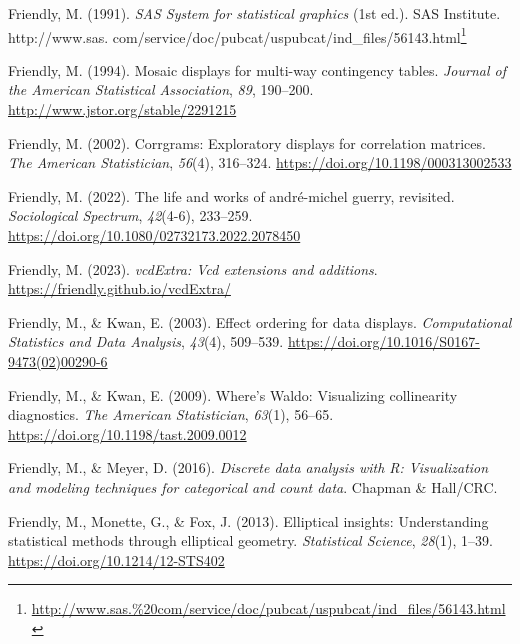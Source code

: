 \documentclass[
  letterpaper,
  10pt,
  krantz2]{krantz}
\newlength{\cslhangindent}
\newlength{\cslentryspacingunit} %
\newenvironment{CSLReferences}[2] %
 {%
  \setlength{\parindent}{0pt}
  \ifodd #1
  \let\oldpar\par
  \def\par{\hangindent=\cslhangindent\oldpar}
  \fi
  \setlength{\parskip}{#2\cslentryspacingunit}
 }%
 {}
\providecommand{\href}[2]{#2\footnote{\url{#1}}}
\begin{document}
\begin{CSLReferences}{1}{0}
\leavevmode{}%
Friendly, M. (1991). \emph{{SAS System} for statistical graphics} (1st
ed.). SAS Institute.
\href{http://www.sas.\%20com/service/doc/pubcat/uspubcat/ind_files/56143.html}{http://www.sas.
com/service/doc/pubcat/uspubcat/ind\_files/56143.html}

\leavevmode{}%
Friendly, M. (1994). Mosaic displays for multi-way contingency tables.
\emph{Journal of the American Statistical Association}, \emph{89},
190--200. \url{http://www.jstor.org/stable/2291215}

\leavevmode{}%
Friendly, M. (2002). Corrgrams: Exploratory displays for correlation
matrices. \emph{The American Statistician}, \emph{56}(4), 316--324.
\url{https://doi.org/10.1198/000313002533}

\leavevmode{}%
Friendly, M. (2022). The life and works of andr{é}-michel guerry,
revisited. \emph{Sociological Spectrum}, \emph{42}(4-6), 233--259.
\url{https://doi.org/10.1080/02732173.2022.2078450}

\leavevmode{}%
Friendly, M. (2023). \emph{vcdExtra: Vcd extensions and additions}.
\url{https://friendly.github.io/vcdExtra/}

\leavevmode{}%
Friendly, M., \& Kwan, E. (2003). Effect ordering for data displays.
\emph{Computational Statistics and Data Analysis}, \emph{43}(4),
509--539. \url{https://doi.org/10.1016/S0167-9473(02)00290-6}

\leavevmode{}%
Friendly, M., \& Kwan, E. (2009). Where's {Waldo}: Visualizing
collinearity diagnostics. \emph{The American Statistician},
\emph{63}(1), 56--65. \url{https://doi.org/10.1198/tast.2009.0012}

\leavevmode{}%
Friendly, M., \& Meyer, D. (2016). \emph{Discrete data analysis with
{R}: Visualization and modeling techniques for categorical and count
data}. Chapman \& Hall/CRC.

\leavevmode{}%
Friendly, M., Monette, G., \& Fox, J. (2013). Elliptical insights:
Understanding statistical methods through elliptical geometry.
\emph{Statistical Science}, \emph{28}(1), 1--39.
\url{https://doi.org/10.1214/12-STS402}


\end{CSLReferences}
\end{document}
